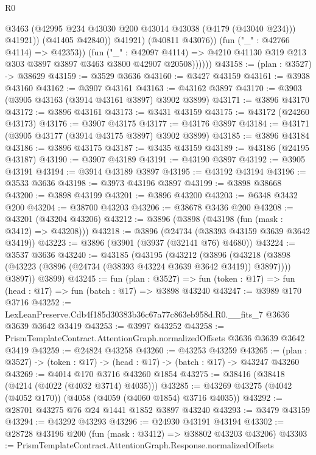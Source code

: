 \begin{lexlean}{R0}
\begin{coremodule}
                          @3463
                          (@42995 @234 @43030 @200 @43014 @43038 (@4179 (@43040 @234)))
                          @41921))
                      (@41405 @42840))
                    @41921)
                  (@40811 @43076))
                (fun ("_" : @42766 @4114) => @42353))
              (fun ("_" : @42097 @4114) =>
              @4210 @41130 @319 @213 @303 @3897 @3897 @3463 @3800 @42907 @20508))))))
@43158 := (plan : @3527) -> @38629
@43159 := @3529 @3636
@43160 := @3427 @43159
@43161 := @3938 @43160
@43162 := @3907 @43161
@43163 := @43162 @3897
@43170 := @3903 (@3905 @43163 (@3914 @43161 @3897) @3902 @3899)
@43171 := @3896 @43170
@43172 := @3896 @43161
@43173 := @3431 @43159
@43175 := @43172 (@24260 @43173)
@43176 := @3907 @43175
@43177 := @43176 @3897
@43184 := @43171 (@3905 @43177 (@3914 @43175 @3897) @3902 @3899)
@43185 := @3896 @43184
@43186 := @3896 @43175
@43187 := @3435 @43159
@43189 := @43186 (@24195 @43187)
@43190 := @3907 @43189
@43191 := @43190 @3897
@43192 := @3905 @43191
@43194 := @3914 @43189 @3897
@43195 := @43192 @43194
@43196 := @3533 @3636
@43198 := @3973 @43196 @3897
@43199 := @3898 @38668
@43200 := @3898 @43199
@43201 := @3896 @43200
@43203 := @6348 @3432 @200
@43204 := @38700 @43203
@43206 := @38678 @3436 @200
@43208 := @43201 (@43204 @43206)
@43212 := @3896 (@3898 (@43198 (fun (mask : @3412) => @43208)))
@43218 := @3896 (@24734 (@38393 @43159 @3639 @3642 @3419))
@43223 := @3896 (@3901 (@3937 (@32141 @76) @4680))
@43224 := @3537 @3636
@43240 := @43185
    (@43195
      (@43212
        (@3896
          (@43218 (@3898 (@43223 (@3896 (@24734 (@38393 @43224 @3639 @3642 @3419)) @3897))))
          @3897))
      @3899)
@43245 := fun (plan : @3527) =>
  fun (token : @17) => fun (head : @17) => fun (batch : @17) => @3898 @43240
@43247 := @3989 @170 @3716
@43252 := LexLeanPreserve.Cdb4f185d30383b36c67a77c863eb958d.R0.__fits_7 @3636 @3639 @3642 @3419
@43253 := @3997 @43252
@43258 := PrismTemplateContract.AttentionGraph.normalizedOffsets @3636 @3639 @3642 @3419
@43259 := @24824 @43258
@43260 := @43253 @43259
@43265 := (plan : @3527) -> (token : @17) -> (head : @17) -> (batch : @17) -> @43247 @43260
@43269 := @4014 @170 @3716 @43260 @1854
@43275 := @38416 (@38418 (@4214 (@4022 (@4032 @3714) @4035)))
@43285 := @43269 @43275 (@4042 (@4052 @170)) (@4058 (@4059 (@4060 @1854) @3716 @4035))
@43292 := @28701 @43275 @76 @24 @1441 @1852 @3897 @43240
@43293 := @3479 @43159
@43294 := @43292 @43293
@43296 := @24930 @43191 @43194
@43302 := @28728 @43196 @200 (fun (mask : @3412) => @38802 @43203 @43206)
@43303 := PrismTemplateContract.AttentionGraph.Response.normalizedOffsets

\end{coremodule}
\end{lexlean}
